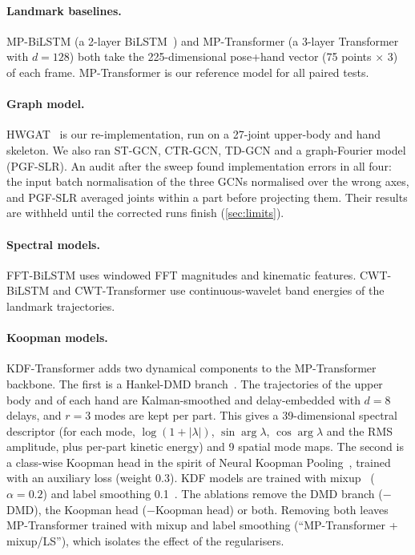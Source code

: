 \documentclass[11pt]{article}
\begin{document}
\paragraph{Landmark baselines.}
MP-BiLSTM (a 2-layer BiLSTM~\citep{hochreiter1997lstm}) and MP-Transformer (a 3-layer
Transformer with $d{=}128$) both take the 225-dimensional pose+hand vector (75 points $\times$
3) of each frame. MP-Transformer is our reference model for all paired tests.

\paragraph{Graph model.}
HWGAT~\citep{patra2024hwgat} is our re-implementation, run on a 27-joint upper-body and hand
skeleton. We also ran ST-GCN, CTR-GCN, TD-GCN and a graph-Fourier model (PGF-SLR). An audit
after the sweep found implementation errors in all four: the input batch normalisation of the
three GCNs normalised over the wrong axes, and PGF-SLR averaged joints within a part before
projecting them. Their results are withheld until the corrected runs finish (\cref{sec:limits}).

\paragraph{Spectral models.}
FFT-BiLSTM uses windowed FFT magnitudes and kinematic features. CWT-BiLSTM and
CWT-Transformer use continuous-wavelet band energies of the landmark trajectories.

\paragraph{Koopman models.}
KDF-Transformer adds two dynamical components to the MP-Transformer backbone. The first is a
Hankel-DMD branch~\citep{arbabi2017hankel}. The trajectories of the upper body and of each
hand are Kalman-smoothed and delay-embedded with $d{=}8$ delays, and $r{=}3$ modes are kept
per part. This gives a 39-dimensional spectral descriptor (for each mode, $\log(1{+}|\lambda|)$,
$\sin\arg\lambda$, $\cos\arg\lambda$ and the RMS amplitude, plus per-part kinetic energy) and
9 spatial mode maps. The second is a class-wise Koopman head in the spirit of Neural Koopman
Pooling~\citep{wang2023koopman}, trained with an auxiliary loss (weight 0.3). KDF models are
trained with mixup~\citep{zhang2018mixup} ($\alpha{=}0.2$) and label smoothing
0.1~\citep{szegedy2016inception}. The ablations remove the DMD branch ($-$DMD), the Koopman
head ($-$Koopman head) or both. Removing both leaves MP-Transformer trained with mixup and
label smoothing (``MP-Transformer + mixup/LS''), which isolates the effect of the
regularisers.
\end{document}
